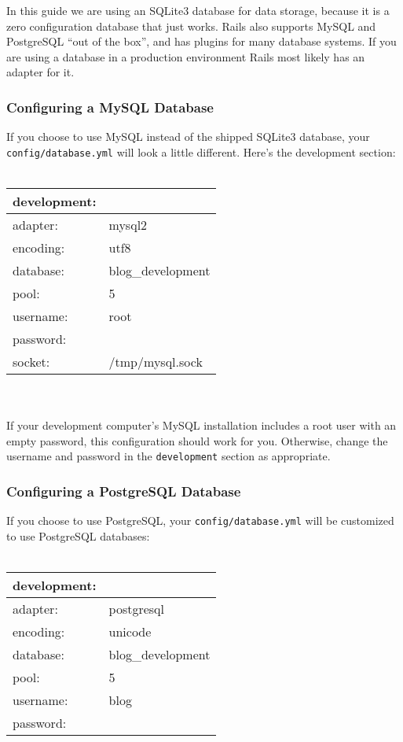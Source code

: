 \documentclass[10pt]{book}
\begin{document}
In this guide we are using an SQLite3 database for data storage, because it is a zero configuration database that just works. Rails also supports MySQL and PostgreSQL “out of the box”, and has plugins for many database systems. If you are using a database in a production environment Rails most likely has an adapter for it.

\subsubsection{ Configuring a MySQL Database}

If you choose to use MySQL instead of the shipped SQLite3 database, your \texttt{config/database.yml} will look a little different. Here’s the development section:
\\ \\
\begin{tabular}{ll}
development:\\
\hline
adapter: & mysql2 \\
encoding: & utf8 \\
database: & blog\_development \\
pool: & 5 \\
username: & root\\
password:\\
socket: & /tmp/mysql.sock
\end{tabular}
\\ \\
If your development computer’s MySQL installation includes a root user with an empty password, this configuration should work for you. Otherwise, change the username and password in the \texttt{development} section as appropriate.

\subsubsection{ Configuring a PostgreSQL Database}

If you choose to use PostgreSQL, your \texttt{config/database.yml} will be customized to use PostgreSQL databases:
\\ \\
\begin{tabular}{ll}
development:\\
\hline
adapter: & postgresql\\
encoding: & unicode\\
database: & blog\_development\\
pool: & 5\\
username: & blog\\
password:
\end{tabular}
\end{document}

